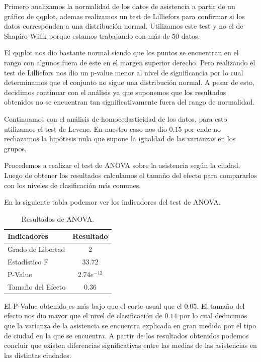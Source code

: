 \documentclass{article} %
\begin{document}
Primero analizamos la normalidad de los datos de asistencia a partir de un gráfico de qqplot, ademas realizamos un test de Lilliefors para confirmar si los datos corresponden a una distribución normal. Utilizamos este test y no el de Shapíro-Willk porque estamos trabajando con más de 50 datos.

El qqplot nos dio bastante normal siendo que los puntos se encuentran en el rango con algunos fuera de este en el margen superior derecho. Pero realizando el test de Lilliefors nos dio un p-value menor al nivel de significancia por lo cual determinamos que el conjunto no sigue una distribución normal. A pesar de esto, decidimos continuar con el análisis ya que suponemos que los resultados obtenidos no se encuentran tan significativamente fuera del rango de normalidad. 

Continuamos con el análisis de homocedasticidad de los datos, para esto utilizamos el test de Levene. En nuestro caso nos dio $0.15$ por ende no rechazamos la hipótesis nula que supone la igualdad de las varianzas en los grupos.

Procedemos a realizar el test de ANOVA sobre la asistencia según la ciudad. Luego de obtener los resultados calculamos el tamaño del efecto para compararlos con los niveles de clasificación más comunes. 

En la siguiente tabla podemor ver los indicadores del test de ANOVA.

\begin{table}[H]
	\centering
		\begin{tabular}{||l | c||}
			\hline
			\hline
			Indicadores & Resultado\\
			\hline			
			\hline
			Grado de Libertad & $2$\\
			\hline
			Estadístico F & $33.72$\\
			\hline
			P-Value & $2.74e^{-12}$\\
			\hline
			Tamaño del Efecto & $0.36$\\
			\hline
			\hline
		\end{tabular}
		\caption{Resultados de ANOVA.}
	\label{tab:table-punto-4-3}
\end{table}

El P-Value obtenido es más bajo que el corte usual que el $0.05$. El tamaño del efecto nos dio mayor que el nivel de clasificación de $0.14$ por lo cual deducimos que la varianza de la asistencia se encuentra explicada en gran medida por el tipo de ciudad en la que se encuentra. A partir de los resultados obtenidos podemos concluir que existen diferencias significativas entre las medias de las asistencias en las distintas ciudades.
\end{document}
